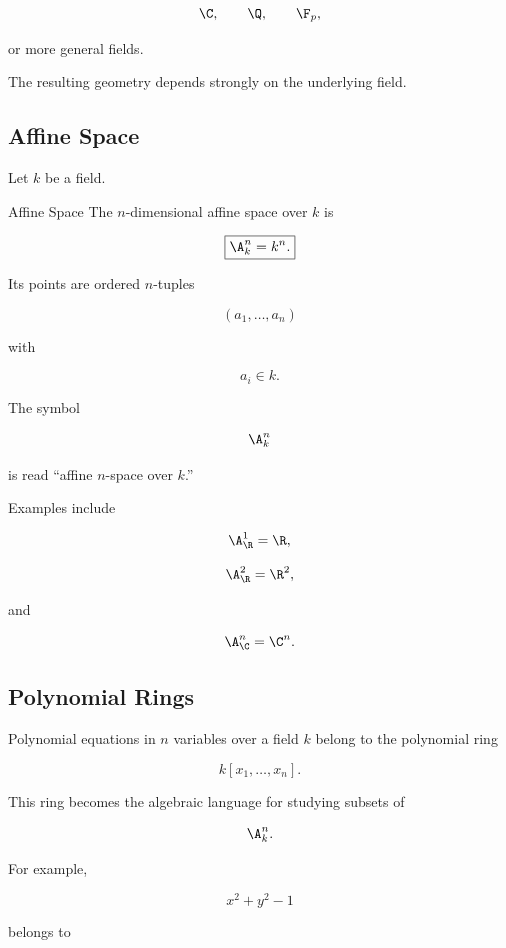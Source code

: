 \[
\C,
\qquad
\Q,
\qquad
\F_p,
\]

or more general fields.

The resulting geometry depends strongly on the underlying field.

\subsection{Affine Space}
\label{subsec:algebraic-affine-space}

Let \(k\) be a field.

\begin{definitionbox}{Affine Space}
The \(n\)-dimensional affine space over \(k\) is

\[
\boxed{
\A^n_k=k^n.
}
\]

Its points are ordered \(n\)-tuples

\[
(a_1,\ldots,a_n)
\]

with

\[
a_i\in k.
\]
\end{definitionbox}

The symbol

\[
\A^n_k
\]

is read ``affine \(n\)-space over \(k\).''

Examples include

\[
\A^1_{\R}=\R,
\]

\[
\A^2_{\R}=\R^2,
\]

and

\[
\A^n_{\C}=\C^n.
\]

\subsection{Polynomial Rings}
\label{subsec:geometry-polynomial-rings}

Polynomial equations in \(n\) variables over a field \(k\) belong to the
polynomial ring

\[
\boxed{
k[x_1,\ldots,x_n].
}
\]

This ring becomes the algebraic language for studying subsets of

\[
\A^n_k.
\]

For example,

\[
x^2+y^2-1
\]

belongs to


